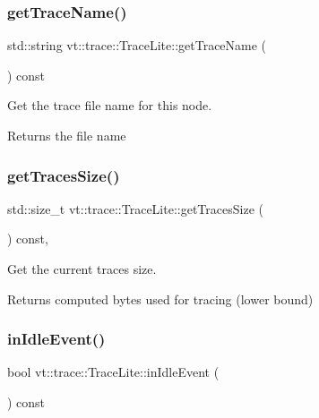 \subsubsection{\texorpdfstring{get\+Trace\+Name()}{getTraceName()}}
{\footnotesize\ttfamily std\+::string vt\+::trace\+::\+Trace\+Lite\+::get\+Trace\+Name (\begin{DoxyParamCaption}{ }\end{DoxyParamCaption}) const\hspace{0.3cm}{\ttfamily [inline]}}



Get the trace file name for this node. 

\begin{DoxyReturn}{Returns}
the file name 
\end{DoxyReturn}
\mbox{\label{structvt_1_1trace_1_1_trace_lite_a1cdbccebe00aec90174e93b3d1fa0bcf}} 
\subsubsection{\texorpdfstring{get\+Traces\+Size()}{getTracesSize()}}
{\footnotesize\ttfamily std\+::size\+\_\+t vt\+::trace\+::\+Trace\+Lite\+::get\+Traces\+Size (\begin{DoxyParamCaption}{ }\end{DoxyParamCaption}) const\hspace{0.3cm}{\ttfamily [inline]}, {\ttfamily [protected]}}



Get the current traces size. 

\begin{DoxyReturn}{Returns}
computed bytes used for tracing (lower bound) 
\end{DoxyReturn}
\mbox{\label{structvt_1_1trace_1_1_trace_lite_ad3b81920d008e46dff0eb205ca99bd22}} 
\subsubsection{\texorpdfstring{in\+Idle\+Event()}{inIdleEvent()}}
{\footnotesize\ttfamily bool vt\+::trace\+::\+Trace\+Lite\+::in\+Idle\+Event (\begin{DoxyParamCaption}{ }\end{DoxyParamCaption}) const}



